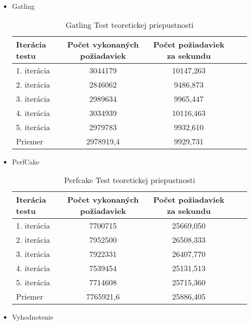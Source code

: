 \documentclass[12pt,oneside,final]{fithesis-utf8}
\begin{document}
\begin{itemize}
\item Gatling

\begin{table}[H]
\begin{center}
\begin{tabular}{ | l | c | c | c | c |}
		\hline
		 \textbf{Iterácia testu} & \textbf{Počet vykonaných požiadaviek} & \textbf{Počet požiadaviek za sekundu} \\ \hline
		 1. iterácia & 3044179 & 10147,263 \\ \hline
		 2. iterácia & 2846062 & 9486,873 \\ \hline
		 3. iterácia & 2989634 & 9965,447 \\ \hline
		 4. iterácia & 3034939 & 10116,463 \\ \hline
		 5. iterácia & 2979783 & 9932,610 \\ \hline
		 Priemer & 2978919,4 & 9929,731 \\ \hline
		 
\end{tabular}
\end{center}
\caption{Gatling Test teoretickej priepustnosti}
\end{table}

\item PerfCake



\begin{table}[H]
\begin{center}
\begin{tabular}{ | l | c | c | c | c |}
		\hline
		 \textbf{Iterácia testu} & \textbf{Počet vykonaných požiadaviek} & \textbf{Počet požiadaviek za sekundu} \\ \hline
		 1. iterácia & 7700715 & 25669,050 \\ \hline
		 2. iterácia & 7952500 & 26508,333 \\ \hline
		 3. iterácia & 7922331 & 26407,770 \\ \hline
		 4. iterácia & 7539454 & 25131,513 \\ \hline
		 5. iterácia & 7714608 & 25715,360 \\ \hline
		 Priemer & 7765921,6 & 25886,405 \\ \hline
		 
\end{tabular}
\end{center}
\caption{Perfcake Test teoretickej priepustnosti}
\end{table}

\item Vyhodnotenie


\end{itemize}
\end{document}
